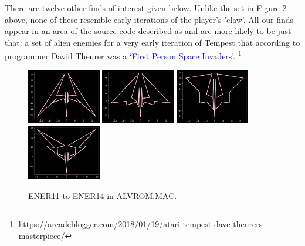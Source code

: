 There are twelve other finds of interest given below. Unlike the set in Figure 2 above, none of these resemble early
iterations of the player's 'claw'. All our finds appear in an area of the source code described as 
and are more likely to be just that: a set of alien enemies for a very early iteration of Tempest that according to
programmer David Theurer was a 
\href{https://arcadeblogger.com/2018/01/19/atari-tempest-dave-theurers-masterpiece/}{\textcolor{blue}{‘First Person Space Invaders’}}.
\footnote{https://arcadeblogger.com/2018/01/19/atari-tempest-dave-theurers-masterpiece/}
\vspace{-0.3cm}
\begin{figure}[H]
  {
        \includegraphics[width=3.22cm]{src/tempest_unused/ENER11.png}%
        \includegraphics[width=3.22cm]{src/tempest_unused/ENER12.png}%
        \includegraphics[width=3.22cm]{src/tempest_unused/ENER13.png}%
        \includegraphics[width=3.22cm]{src/tempest_unused/ENER14.png}%
        \vspace{-0.2cm}
  }\caption*{ENER11 to ENER14 in ALVROM.MAC.}
\end{figure}
